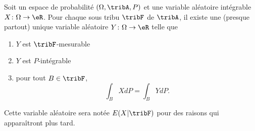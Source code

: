 \begin{theoremDef}     \label{ThoMWfDPQ}
    Soit un espace de probabilité \( (\Omega,\tribA,P)\) et une variable aléatoire intégrable \( X\colon \Omega\to \eR\). Pour chaque sous tribu \( \tribF\) de \( \tribA\), il existe une (presque partout) unique variable aléatoire \( Y\colon \Omega\to \eR\) telle que
    \begin{enumerate}
        \item
            \( Y\) est \( \tribF\)-mesurable
        \item
            \( Y\) est \( P\)-intégrable
        \item
            pour tout \( B\in\tribF\),
            \begin{equation}        \label{EqBwBkgE}
                \int_{B}XdP=\int_B YdP.
            \end{equation}
    \end{enumerate}
    Cette variable aléatoire sera notée \( E(X|\tribF)\) pour des raisons qui apparaîtront plus tard.
\end{theoremDef}

